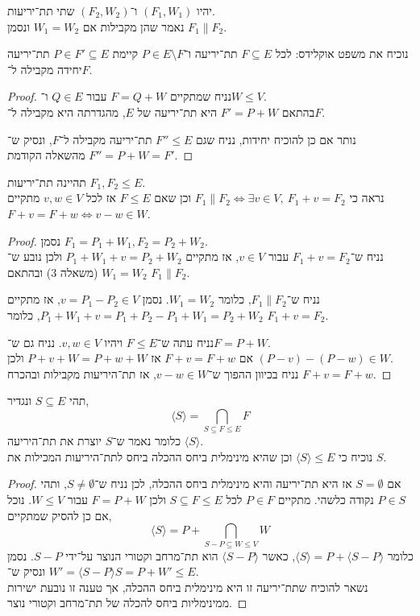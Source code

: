 \question{}
\begin{definition}
	יהיו $(F_1, W_1)$ ו־$(F_2, W_2)$ שתי תת־יריעות. \\
	נאמר שהן מקבילות אם $W_1 = W_2$ ונסמן $F_1 \parallel F_2$.
\end{definition}
נוכיח את משפט אוקלידס: לכל $F \subseteq E$ תת־יריעה ו־$P \in E \setminus F$ קיימת $P \in F' \subseteq E$ תת־יריעה יחידה מקבילה ל־$F$.
\begin{proof}
	נניח שמתקיים $F = Q + W$ עבור $Q \in E$ ו־$W \le V$. \\
	בהתאם $F' = P + W$ היא תת־יריעה של $E$, מהגדרתה היא מקבילה ל־$F$.

	נותר אם כן להוכיח יחידות, נניח שגם $F'' \le E$ תת־יריעה מקבילה ל־$F$, ונסיק ש־$F'' = P + W = F'$ מהשאלה הקודמת.
\end{proof}

\question{}
תהיינה תת־יריעות $F_1, F_2 \le E$. \\
נראה כי $F_1 \parallel F_2 \iff \exists v \in V,\ F_1 + v = F_2$ וכן שאם $F \le E$ אז לכל $v, w \in V$ מתקיים $F + v = F + w \iff v - w \in W$.
\begin{proof}
	נסמן $F_1 = P_1 + W_1, F_2 = P_2 + W_2$. \\
	נניח ש־$F_1 + v = F_2$ עבור $v \in V$, אז מתקיים $P_1 + W_1 + v = P_2 + W_2$ ולכן נובע ש־$W_1 = W_2$ (משאלה 3) ובהתאם $F_1 \parallel F_2$.

	נניח ש־$F_1 \parallel F_2$, כלומר $W_1 = W_2$.
	נסמן $v = P_1 - P_2 \in V$, אז מתקיים $P_1 + W_1 + v = P_1 + P_2 - P_1 + W_1 = P_2 + W_2$, כלומר $F_1 + v = F_2$.

	נניח עתה ש־$F \le E$ ויהיו $v, w \in V$.
	נניח גם ש־$F = P + W$. \\
	אם $F + v = F + w$ אז $P + v + W = P + w + W$ ולכן $(P - v) - (P - w) \in W$. \\
	נניח בכיוון ההפוך ש־$v - w \in W$, אז תת־היריעות מקבילות ובהכרח $F + v = F + w$.
\end{proof}

\question{}
תהי $S \subseteq E$ ונגדיר,
\[
	\langle S \rangle
	= \bigcap_{S \subseteq F \le E} F
\]
כלומר נאמר ש־$S$ יוצרת את תת־היריעה $\langle S \rangle$. \\
נוכיח כי $\langle S \rangle \le E$ וכן שהיא מינימלית ביחס ההכלה ביחס לתת־היריעות המכילות את $S$.
\begin{proof}
	אם $S = \emptyset$ אז היא תת־יריעה והיא מינימלית ביחס ההכלה, לכן נניח ש־$S \ne \emptyset$, ותהי $P \in S$ נקודה כלשהי.
	מתקיים $P \in F$ לכל $S \subseteq F \le E$ ולכן $F = P + W$ עבור $W \le V$.
	נוכל אם כן להסיק שמתקיים,
	\[
		\langle S \rangle
		= P + \bigcap_{S - P \subseteq W \le V} W
	\]
	כלומר $\langle S \rangle = P + \langle S - P \rangle$, כאשר $\langle S - P \rangle$ הוא תת־מרחב וקטורי הנוצר על־ידי $S - P$.
	נסמן $W' = \langle S - P \rangle$ ונסיק ש־$S = P + W' \le E$. \\
	נשאר להוכיח שתת־יריעה זו היא מינימלית ביחס ההכלה, אך טענה זו נובעת ישירות ממינימליות ביחס להכלה של תת־מרחב וקטורי נוצר.
\end{proof}


